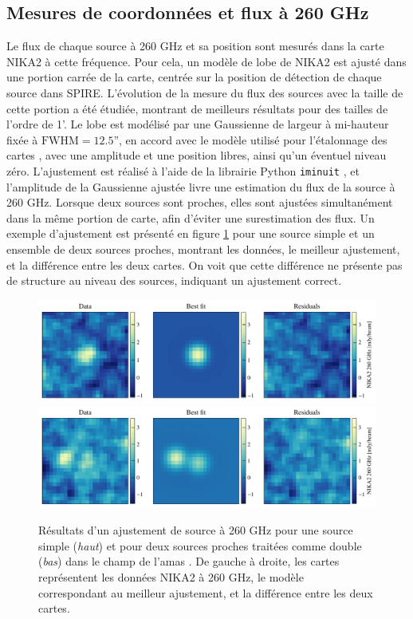 \subsection{Mesures de coordonnées et flux à 260 GHz}

Le flux de chaque source à 260 GHz et sa position sont mesurés dans la carte NIKA2 à cette fréquence.
Pour cela, un modèle de lobe de NIKA2 est ajusté dans une portion carrée de la carte, centrée sur la position de détection de chaque source dans SPIRE.
L'évolution de la mesure du flux des sources avec la taille de cette portion a été étudiée, montrant de meilleurs résultats pour des tailles de l'ordre de 1'.
Le lobe est modélisé par une Gaussienne de largeur à mi-hauteur fixée à $\mathrm{FWHM} = 12.5$'', en accord avec le modèle utilisé pour l'étalonnage des cartes \cite{perotto_calibration_2020}, avec une amplitude et une position libres, ainsi qu'un éventuel niveau zéro.
L'ajustement est réalisé à l'aide de la librairie Python \texttt{iminuit} \cite{hans_dembinski_scikit-hepiminuit_2020}, et l'amplitude de la Gaussienne ajustée livre une estimation du flux de la source à 260 GHz.
Lorsque deux sources sont proches, elles sont ajustées simultanément dans la même portion de carte, afin d'éviter une surestimation des flux.
Un exemple d'ajustement est présenté en figure \ref{fig:pstools_1mm} pour une source simple et un ensemble de deux sources proches, montrant les données, le meilleur ajustement, et la différence entre les deux cartes.
On voit que cette différence ne présente pas de structure au niveau des sources, indiquant un ajustement correct.

\begin{figure}[t]
    \centering
    \includegraphics[width=.7\linewidth]{Figures/Chap_decor/4_1mm_fit.pdf}
    \includegraphics[width=.7\linewidth]{Figures/Chap_decor/2_1mm_fit.pdf}
    \caption{
        Résultats d'un ajustement de source à 260 GHz pour une source simple (\textit{haut}) et pour deux sources proches traitées comme double (\textit{bas}) dans le champ de l'amas \act.
        De gauche à droite, les cartes représentent les données NIKA2 à 260 GHz, le modèle correspondant au meilleur ajustement, et la différence entre les deux cartes.
    }
    \label{fig:pstools_1mm}
\end{figure}

